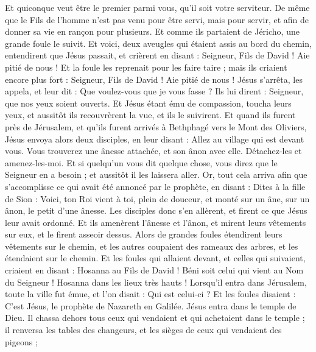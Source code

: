 \begin{multicols}{2}
Et quiconque veut être le premier parmi vous, qu'il soit votre serviteur.
De même que le Fils de l’homme n’est pas venu pour être servi, mais pour servir, et afin de donner sa vie en rançon pour plusieurs.
Et comme ils partaient de Jéricho, une grande foule le suivit.
Et voici, deux aveugles qui étaient assis au bord du chemin, entendirent que Jésus passait, et crièrent en disant : Seigneur, Fils de David ! Aie pitié de nous !
Et la foule les reprenait pour les faire taire ; mais ils criaient encore plus fort : Seigneur, Fils de David ! Aie pitié de nous !
Jésus s'arrêta, les appela, et leur dit : Que voulez-vous que je vous fasse ?
Ils lui dirent : Seigneur, que nos yeux soient ouverts.
Et Jésus étant ému de compassion, toucha leurs yeux, et aussitôt ils recouvrèrent la vue, et ils le suivirent.
\VerseOne{}Et quand ils furent près de Jérusalem, et qu'ils furent arrivés à Bethphagé vers le Mont des Oliviers, Jésus envoya alors deux disciples,
en leur disant : Allez au village qui est devant vous. Vous trouverez une ânesse attachée, et son ânon avec elle. Détachez-les et amenez-les-moi.
Et si quelqu'un vous dit quelque chose, vous direz que le Seigneur en a besoin ; et aussitôt il les laissera aller.
Or, tout cela arriva afin que s’accomplisse ce qui avait été annoncé par le prophète, en disant :
Dites à la fille de Sion : Voici, ton Roi vient à toi, plein de douceur, et monté sur un âne, sur un ânon, le petit d'une ânesse.
Les disciples donc s'en allèrent, et firent ce que Jésus leur avait ordonné.
Et ils amenèrent l'ânesse et l'ânon, et mirent leurs vêtements sur eux, et le firent asseoir dessus.
Alors de grandes foules étendirent leurs vêtements sur le chemin, et les autres coupaient des rameaux des arbres, et les étendaient sur le chemin.
Et les foules qui allaient devant, et celles qui suivaient, criaient en disant : Hosanna au Fils de David ! Béni soit celui qui vient au Nom du Seigneur ! Hosanna dans les lieux très hauts !
Lorsqu’il entra dans Jérusalem, toute la ville fut émue, et l’on disait : Qui est celui-ci ?
Et les foules disaient : C’est Jésus, le prophète de Nazareth en Galilée.
Jésus entra dans le temple de Dieu. Il chassa dehors tous ceux qui vendaient et qui achetaient dans le temple ; il renversa les tables des changeurs, et les sièges de ceux qui vendaient des pigeons ;

\end{multicols}
